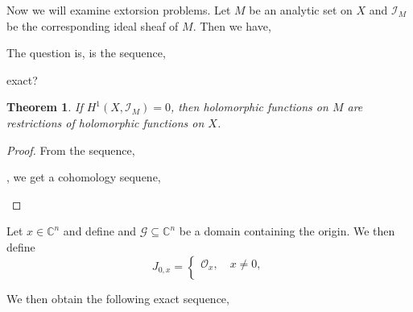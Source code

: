 \documentclass{article}
\newtheorem{theorem}{Theorem} [section]
\newcommand{\C}[0]{\mathbb{C}}
\newcommand{\G}[0]{\mathcal{G}}
\newcommand{\Ouv}[0]{\mathcal{O}}
\begin{document}
  Now we will examine extorsion problems. Let $M$ be an analytic set on $X$ and $\mathcal{I}_M$ be the corresponding ideal sheaf of $M$. Then we have,
  \begin{center}
  \end{center}

The question is, is the sequence,
exact?

\begin{theorem}
  If $H^1(X,\mathcal{I}_M)=0$, then holomorphic functions on $M$ are restrictions of holomorphic functions on $X$.
\end{theorem}

\begin{proof}
  From the sequence,\begin{center}
  \end{center},
  we get a cohomology sequene,
  \begin{center}
  \end{center}
\end{proof}

Let $x\in\C^n$ and define and $\G\subseteq\C^n$ be a domain containing the origin. We then define 
\begin{equation*}
  J_{0,x} = \begin{cases}
    \Ouv_x,\quad x\not=0,\\
  \end{cases}
\end{equation*}

We then obtain the following exact sequence,
\begin{center}
\end{center}
\end{document}
